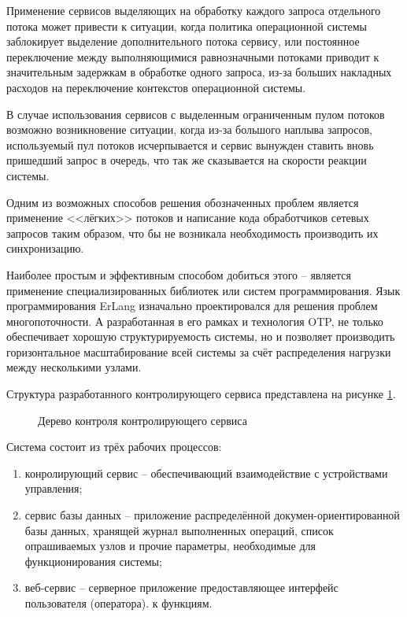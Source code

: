 Применение сервисов выделяющих на обработку каждого запроса отдельного потока может привести к
ситуации, когда политика операционной системы заблокирует выделение дополнительного потока сервису,
или постоянное переключение между выполняющимися равнозначными потоками приводит к значительным задержкам
в обработке одного запроса, из-за больших накладных расходов на переключение контекстов операционной системы.

В случае использования сервисов с выделенным ограниченным пулом потоков возможно возникновение ситуации, когда
из-за большого наплыва запросов, используемый пул потоков исчерпывается и сервис вынужден ставить вновь
пришедший запрос в очередь, что так же сказывается на скорости реакции системы.

Одним из возможных способов решения обозначенных проблем является применение <<лёгких>> потоков и написание кода
обработчиков сетевых запросов таким образом, что бы не возникала необходимость производить их синхронизацию.


Наиболее простым и эффективным способом добиться этого -- является применение специализированных библиотек или
систем программирования. Язык программирования ErLang изначально проектировался для решения проблем
многопоточности. А разработанная в его рамках и технология OTP, не только обеспечивает хорошую структурируемость
системы, но и позволяет производить горизонтальное масштабирование всей системы за счёт распределения нагрузки
между несколькими узлами.

Структура разработанного контролирующего сервиса представлена на рисунке \ref{img:otpStruct}.
\begin{figure}[ht]
	\caption{Дерево контроля контролирующего сервиса}
	\label{img:otpStruct}
\end{figure}

Система состоит из трёх рабочих процессов:
\begin{enumerate}
	\item конролирующий сервис -- обеспечивающий взаимодействие с устройствами управления;
	\item сервис базы данных -- приложение распределённой докумен-ориентированной базы данных,
	хранящей журнал выполненных операций, список опрашиваемых узлов и прочие параметры,
	необходимые для функционирования системы;
	\item веб-сервис -- серверное приложение предоставляющее интерфейс пользователя (оператора).
	к функциям.
\end{enumerate}

